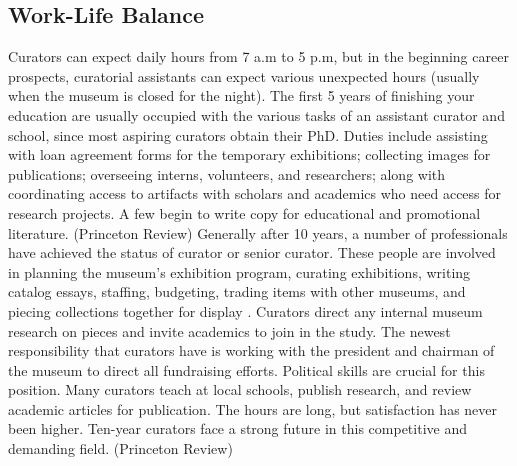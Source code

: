 \begin{multicols}{2}
\section{Work-Life Balance}
	Curators can expect daily hours from 7 a.m to 5 p.m, but in the beginning career prospects, curatorial assistants can expect various unexpected hours (usually when the museum is closed for the night). The first 5 years of finishing your education are usually occupied with the various tasks of an assistant curator and school, since most aspiring curators obtain their PhD.  Duties include assisting with loan agreement forms for the temporary exhibitions; collecting images for publications; overseeing interns, volunteers, and researchers; along with coordinating access to artifacts with scholars and academics who need access for research projects. A few begin to write copy for educational and promotional literature. (Princeton Review) Generally after 10 years, a number of professionals have achieved the status of curator or senior curator. These people are involved in planning the museum’s exhibition program, curating exhibitions, writing catalog essays, staffing, budgeting, trading items with other museums, and piecing collections together for display . Curators direct any internal museum research on pieces and invite academics to join in the study. The newest responsibility that curators have is working with the president and chairman of the museum to direct all fundraising efforts. Political skills are crucial for this position. Many curators teach at local schools, publish research, and review academic articles for publication. The hours are long, but satisfaction has never been higher. Ten-year curators face a strong future in this competitive and demanding field. (Princeton Review) 
\end{multicols}